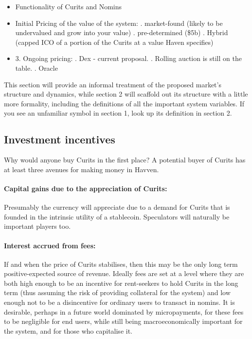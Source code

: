 \documentclass{article}
\begin{document}
\begin{itemize}
	\item Functionality of Curits and Nomins
	\item Initial Pricing of the value of the system:
		. market-found (likely to be undervalued and grow into your value)
		. pre-determined (\$5b)
		. Hybrid (capped ICO of a portion of the Curits at a value Haven specifies)
	\item 3. Ongoing pricing:
		. Dex - current proposal.
		. Rolling auction is still on the table.
		. Oracle
\end{itemize}

This section will provide an informal treatment of the proposed market's structure and dynamics, while section 2 will scaffold out its structure with a little more formality, including the definitions of all the important system variables. If you see an unfamiliar symbol in section 1, look up its definition in section 2.

\subsection{Investment incentives}

Why would anyone buy Curits in the first place? A potential buyer of Curits has at least three avenues for making money in Havven.

\paragraph{Capital gains due to the appreciation of Curits:}
Presumably the currency will appreciate due to a demand for Curits that is founded in the intrinsic utility of a stablecoin. Speculators will naturally be important players too.

\paragraph{Interest accrued from fees:}
If and when the price of Curits stabilises, then this may be the only long term positive-expected source of revenue. Ideally fees are set at a level where they are both high enough to be an incentive for rent-seekers to hold Curits in the long term (thus assuming the risk of providing collateral for the system) and low enough not to be a disincentive for ordinary users to transact in nomins.
It is desirable, perhaps in a future world dominated by micropayments, for these fees to be negligible for end users, while still being macroeconomically important for the system, and for those who capitalise it.
\end{document}
